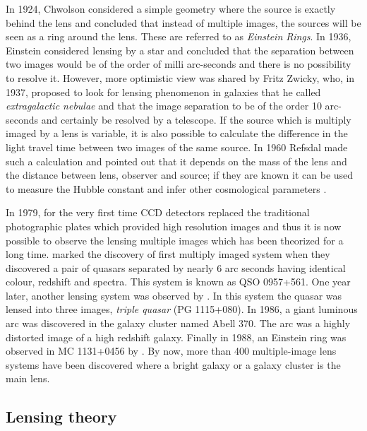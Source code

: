 \documentclass[
  11pt,
  twoside,
  openright,
  titlepage,
  headings=optiontoheadandtoc
]{scrbook}
\begin{document}
In 1924, Chwolson
considered a simple geometry where the source is exactly behind the lens
and concluded that instead of multiple images, the sources will be seen
as a ring around the lens. These are referred to as {\it Einstein Rings}.
In 1936, Einstein
considered lensing by a star and concluded that the separation between two images
would be of the order of milli arc-seconds and there is no possibility to
resolve it. However, more optimistic view was shared by Fritz Zwicky, who, in 1937,
proposed to look for lensing phenomenon in galaxies that he called 
{\it extragalactic nebulae} and that the image separation to be of the order 10 arc-seconds
and certainly be resolved by a telescope. If the source which is multiply imaged
by a lens is variable, it is also possible to calculate the difference 
in the light travel time between two images of the same source. In 1960 Refsdal
made such a calculation and pointed out that it depends on the mass of the lens
and the distance between lens, observer and source; if they are known it can be 
used to measure the Hubble constant and infer other cosmological parameters
\cite{2004tomu.conf..231R}. 



In 1979, for the very first time CCD detectors replaced the traditional photographic
plates which provided high resolution 
images and thus it is now possible to observe the lensing multiple images
which has been theorized for a long time. \cite{1979Natur.279..381W} marked
the discovery of first multiply imaged system when they discovered a pair of quasars
separated by nearly 6 arc seconds having identical colour, redshift and spectra. This
system is known as QSO 0957+561. One year later, another lensing system was observed
by \cite{1980Natur.285..641W}. In this system the quasar was lensed into three
images, {\it triple quasar} (PG 1115+080). In 1986, a giant luminous
arc was discovered in the galaxy cluster named Abell 370. The arc
was a highly distorted image of a high redshift galaxy. Finally in 1988, an Einstein
ring was observed in MC 1131+0456 by \cite{1988Natur.333..537H}. By now, more than 
400 multiple-image lens systems have been discovered where a bright galaxy
or a galaxy cluster is the main lens. 





\subsection{Lensing theory}
\end{document}
